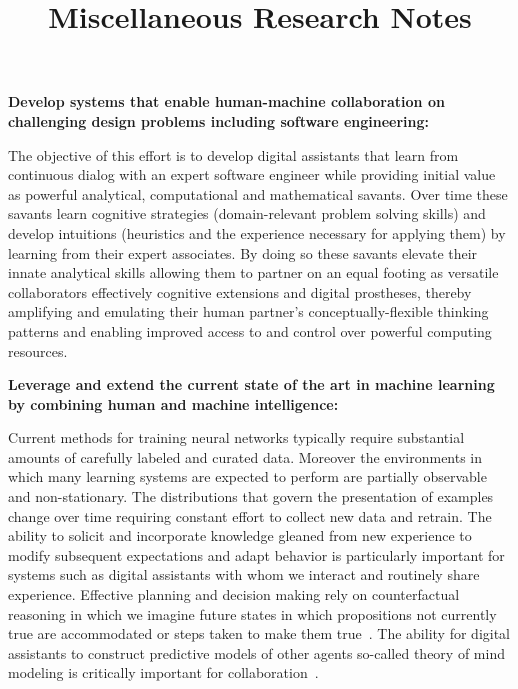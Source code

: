 \documentclass[letterpaper,12pt]{article}
\title{Miscellaneous Research Notes}
\date{}
\begin{document}

{\bf{Develop systems that enable human-machine collaboration on challenging design problems including software engineering:}}

The objective of this effort is to develop digital assistants that learn from continuous dialog with an expert software engineer while providing initial value as powerful analytical, computational and mathematical savants. Over time these savants learn cognitive strategies (domain-relevant problem solving skills) and develop intuitions (heuristics and the experience necessary for applying them) by learning from their expert associates. By doing so these savants elevate their innate analytical skills allowing them to partner on an equal footing as versatile collaborators \emdash{} effectively cognitive extensions and digital prostheses, thereby amplifying and emulating their human partner's conceptually-flexible thinking patterns and enabling improved access to and control over powerful computing resources. 


{\bf{Leverage and extend the current state of the art in machine learning by combining human and machine intelligence:}}

Current methods for training neural networks typically require substantial amounts of carefully labeled and curated data. Moreover the environments in which many learning systems are expected to perform are partially observable and non-stationary. The distributions that govern the presentation of examples change over time requiring constant effort to collect new data and retrain. The ability to solicit and incorporate knowledge gleaned from new experience to modify subsequent expectations and adapt behavior is particularly important for systems such as digital assistants with whom we interact and routinely share experience. Effective planning and decision making rely on counterfactual reasoning in which we imagine future states in which propositions not currently true are accommodated or steps taken to make them true~\cite{HassabisandMaguireTiCS-07}. The ability for digital assistants to construct predictive models of other agents \emdash{} so-called theory of mind modeling \emdash{} is critically important for collaboration~\cite{RabinowitzetalCoRR-18}.

\end{document}
